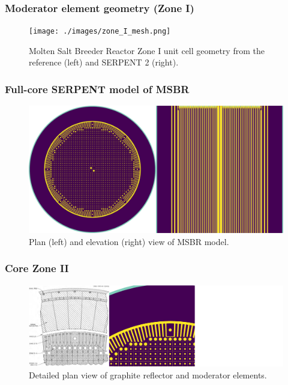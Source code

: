 \begin{frame}
  \frametitle{Moderator element geometry (Zone I)}
    \begin{figure}[t]
                \vspace*{-0.2in}
                   \hspace*{-0.37in}
                \texttt{[image: ./images/zone\_I\_mesh.png]}
                \vspace*{-0.05in}
                \caption{Molten Salt Breeder Reactor Zone I unit cell geometry from the reference \cite{robertson_conceptual_1971} (left) and SERPENT 2 (right).}
      \end{figure}
     
\end{frame}

\begin{frame}
  \frametitle{Full-core SERPENT model of \gls{MSBR}}
    \begin{figure}[t]
                \vspace*{-0.2in}
                   \hspace*{-0.39in}
                \includegraphics[height=0.6\textwidth]{./images/geometry_main_views.png}
                \caption{Plan (left) and elevation (right) view of MSBR model.}
      \end{figure}
     
\end{frame}

\begin{frame}
  \frametitle{Core Zone II}
  \begin{figure}[t]
     \vspace{-0.25in}
       \hspace*{-0.43in}
       \includegraphics[height=0.77\textheight]{./images/reflector_and_elements.png}
            \caption{Detailed plan view of graphite reflector and moderator elements.}
  \end{figure}
           \vspace{-0.1in}
\end{frame}

